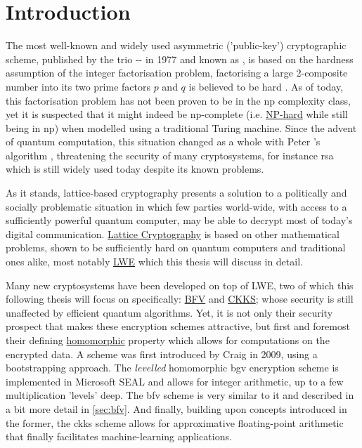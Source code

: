 \chapter{Introduction}
\label{chap:introduction}
The most well-known and widely used asymmetric ('public-key') cryptographic scheme, published by the trio -- in 1977 and known as , is based on the hardness assumption of the integer factorisation problem, factorising a large 2-composite number into its two prime factors $p$ and $q$ is believed to be hard \parencite{1983-rsa}.
As of today, this factorisation problem has not been proven to be in the \gls{np} complexity class, yet it is suspected that it might indeed be \gls{np}-complete (i.e. \hyperref[def:np-hard]{NP-hard} while still being in \gls{np}) when modelled using a traditional Turing machine.
Since the advent of quantum computation, this situation changed as a whole with Peter 's algorithm \parencite{1997-shors-algorithm}, threatening the security of many cryptosystems, for instance \gls{rsa} which is still widely used today despite its known problems.

As it stands, lattice-based cryptography presents a solution to a politically and socially problematic situation in which few parties world-wide, with access to a sufficiently powerful quantum computer, may be able to decrypt most of today's digital communication.
\hyperref[subsec:lattice-crypto]{Lattice Cryptography} is based on other mathematical problems, shown to be sufficiently hard on quantum computers and traditional ones alike, most notably \hyperref[def:lwe-search-problem]{LWE} which this thesis will discuss in detail.

Many new cryptosystems have been developed on top of LWE, two of which this following thesis will focus on specifically: \hyperref[def:bfv-scheme]{BFV} and \hyperref[def:ckks-scheme]{CKKS};
whose security is still unaffected by efficient quantum algorithms.
Yet, it is not only their security prospect that makes these encryption schemes attractive, but first and foremost their defining \hyperref[def:ring-homomorphism]{homomorphic} property which allows for computations on the encrypted data.
A  scheme was first introduced by Craig  in 2009, using a bootstrapping approach.
The \textit{levelled} homomorphic \gls{bgv} encryption scheme is implemented in Microsoft SEAL and allows for integer arithmetic, up to a few multiplication 'levels' deep.
The \gls{bfv} scheme is very similar to it and described in a bit more detail in \autoref{sec:bfv}.
And finally, building upon concepts introduced in the former, the \gls{ckks} scheme allows for approximative floating-point arithmetic that finally facilitates machine-learning applications.

